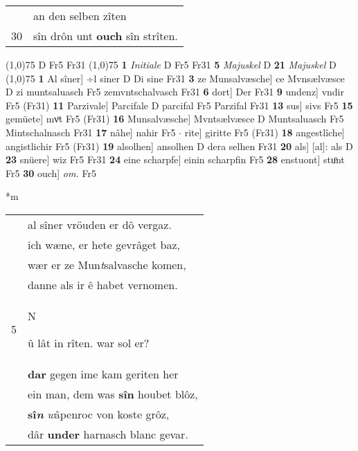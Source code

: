 \documentclass[8pt,a4paper,notitlepage]{article}
\begin{document}
\begin{table}[ht]
\begin{minipage}[t]{0.5\linewidth}
\begin{tabular}{rl}
 & an den selben zîten\\ 
30 & sîn drôn unt \textbf{ouch} sîn strîten.\\ 
\end{tabular}
\scriptsize
\line(1,0){75} \newline
D Fr5 Fr31 \newline
\line(1,0){75} \newline
\textbf{1} \textit{Initiale} D Fr5 Fr31  \textbf{5} \textit{Majuskel} D  \textbf{21} \textit{Majuskel} D  \newline
\line(1,0){75} \newline
\textbf{1} Al sîner] ÷l siner D Di sine Fr31 \textbf{3} ze Munsalvæsche] ce Mvnsælvæsce D zi muntsaluasch Fr5 zemvntschalvasch Fr31 \textbf{6} dort] Der Fr31 \textbf{9} undenz] vndir Fr5 (Fr31) \textbf{11} Parzivale] Parcifale D parcifal Fr5 Parzifal Fr31 \textbf{13} sus] sivs Fr5 \textbf{15} gemüete] mvͦt Fr5 (Fr31) \textbf{16} Munsalvæsche] Mvntsælvæsce D Muntsaluasch Fr5 Mintschalnasch Fr31 \textbf{17} nâhe] nahir Fr5  $\cdot$ rite] giritte Fr5 (Fr31) \textbf{18} angestlîche] angistlichir Fr5 (Fr31) \textbf{19} alsolhen] ansolhen D dera selhen Fr31 \textbf{20} als] [al]: als D \textbf{23} snüere] wiz Fr5 Fr31 \textbf{24} eine scharpfe] einin scharpfin Fr5 \textbf{28} enstuont] stuͦnt Fr5 \textbf{30} ouch] \textit{om.} Fr5 \newline
\end{minipage}
\hspace{0.5cm}
\begin{minipage}[t]{0.5\linewidth}
\small
\begin{center}*m
\end{center}
\begin{tabular}{rl}
 & al sîner vröuden er dô vergaz.\\ 
 & ich wæne, er hete gevrâget baz,\\ 
 & wær er ze Mun\textit{t}salvasche komen,\\ 
 & danne als ir ê habet vernomen.\\ 
5 & \begin{large}N\end{large}û lât in rîten. war sol er?\\ 
 & \textbf{dar} gegen ime kam geriten her\\ 
 & ein man, dem was \textbf{sîn} houbet blôz,\\ 
 & \textbf{sî\textit{n}} \textit{w}âpenroc von koste grôz,\\ 
 & dâr \textbf{under} harnasch blanc gevar.\\ 

\end{tabular}
\end{minipage}
\end{table}
\end{document}
